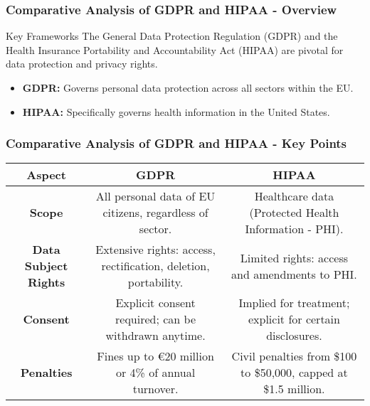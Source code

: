 \documentclass[aspectratio=169]{beamer}
\begin{document}
\begin{frame}[fragile]
    \frametitle{Comparative Analysis of GDPR and HIPAA - Overview}
    \begin{block}{Key Frameworks}
        The General Data Protection Regulation (GDPR) and the Health Insurance Portability and Accountability Act (HIPAA) are pivotal for data protection and privacy rights.
    \end{block}
    \begin{itemize}
        \item \textbf{GDPR:} Governs personal data protection across all sectors within the EU.
        \item \textbf{HIPAA:} Specifically governs health information in the United States.
    \end{itemize}
\end{frame}

\begin{frame}[fragile]
    \frametitle{Comparative Analysis of GDPR and HIPAA - Key Points}
    \begin{table}[h]
        \centering
        \begin{tabular}{|c|c|c|}
            \hline
            \textbf{Aspect}                  & \textbf{GDPR}                                                & \textbf{HIPAA}                                          \\
            \hline
            \textbf{Scope}                  & All personal data of EU citizens, regardless of sector.    & Healthcare data (Protected Health Information - PHI). \\
            \hline
            \textbf{Data Subject Rights}    & Extensive rights: access, rectification, deletion, portability. & Limited rights: access and amendments to PHI.          \\
            \hline
            \textbf{Consent}                & Explicit consent required; can be withdrawn anytime.         & Implied for treatment; explicit for certain disclosures. \\
            \hline
            \textbf{Penalties}              & Fines up to €20 million or 4\% of annual turnover.          & Civil penalties from \$100 to \$50,000, capped at \$1.5 million. \\
            \hline
        \end{tabular}
    \end{table}
\end{frame}
\end{document}
